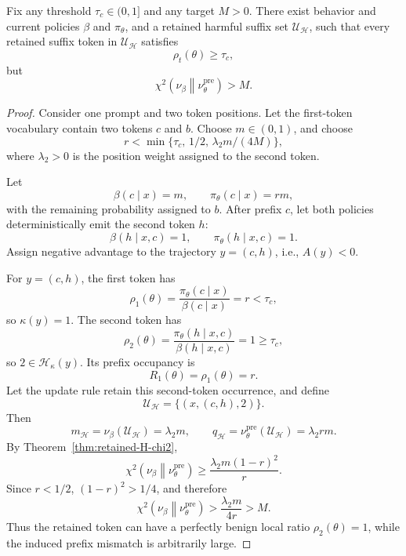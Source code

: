 \begin{corollary}
\label{cor:non-tiny-local-ratio}
Fix any threshold \(\tau_c\in(0,1]\) and any target \(M>0\). There exist
behavior and current policies \(\beta\) and \(\pi_\theta\), and a retained
harmful suffix set \(\mathcal U_{\mathcal H}\), such that every retained suffix token in
\(\mathcal U_{\mathcal H}\) satisfies
\[
    \rho_t(\theta)\ge \tau_c,
\]
but
\[
    \chi^2\!\left(\nu_\beta\middle\|\nu_\theta^{\mathrm{pre}}\right)
    >
    M.
\]
\end{corollary}

\begin{proof}
Consider one prompt and two token positions. Let the first-token vocabulary
contain two tokens \(c\) and \(b\). Choose \(m\in(0,1)\), and choose
\[
    r < \min\{\tau_c,\,1/2,\,\lambda_2 m/(4M)\},
\]
where \(\lambda_2>0\) is the position weight assigned to the second token.

Let
\[
    \beta(c\mid x)=m,
    \qquad
    \pi_\theta(c\mid x)=rm,
\]
with the remaining probability assigned to \(b\). After prefix \(c\), let both
policies deterministically emit the second token \(h\):
\[
    \beta(h\mid x,c)=1,
    \qquad
    \pi_\theta(h\mid x,c)=1.
\]
Assign negative advantage to the trajectory \(y=(c,h)\), i.e.,
\(A(y)<0\).

For \(y=(c,h)\), the first token has
\[
    \rho_1(\theta)
    =
    \frac{\pi_\theta(c\mid x)}{\beta(c\mid x)}
    =
    r
    <
    \tau_c,
\]
so \(\kappa(y)=1\). The second token has
\[
    \rho_2(\theta)
    =
    \frac{\pi_\theta(h\mid x,c)}{\beta(h\mid x,c)}
    =
    1
    \ge
    \tau_c,
\]
so \(2\in \mathcal H_\kappa(y)\). Its prefix occupancy is
\[
    R_1(\theta)=\rho_1(\theta)=r.
\]
Let the update rule retain this second-token occurrence, and define
\[
    \mathcal U_{\mathcal H}=\{(x,(c,h),2)\}.
\]
Then
\[
    m_{\mathcal H}=\nu_\beta(\mathcal U_{\mathcal H})=\lambda_2 m,
    \qquad
    q_{\mathcal H}=\nu_\theta^{\mathrm{pre}}(\mathcal U_{\mathcal H})=\lambda_2 r m.
\]
By Theorem~\ref{thm:retained-H-chi2},
\[
    \chi^2\!\left(\nu_\beta\middle\|\nu_\theta^{\mathrm{pre}}\right)
    \ge
    \frac{\lambda_2 m(1-r)^2}{r}.
\]
Since \(r<1/2\), \((1-r)^2>1/4\), and therefore
\[
    \chi^2\!\left(\nu_\beta\middle\|\nu_\theta^{\mathrm{pre}}\right)
    >
    \frac{\lambda_2 m}{4r}
    >
    M.
\]
Thus the retained token can have a perfectly benign local ratio
\(\rho_2(\theta)=1\), while the induced prefix mismatch is arbitrarily large.
\end{proof}

